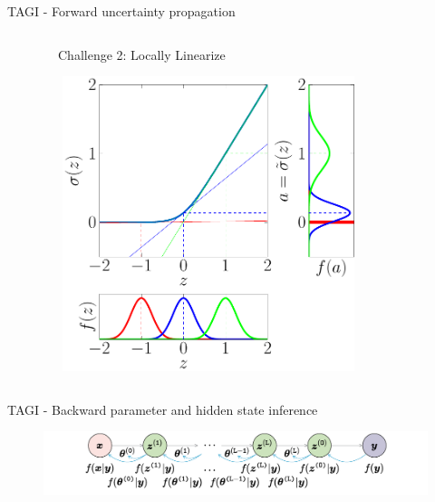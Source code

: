 \documentclass[final]{beamer}
\begin{document}
\begin{frame}[t]
\begin{columns}
\begin{column}[T]{.31\textwidth}
\begin{block}{TAGI - Forward uncertainty propagation}
\begin{columns}
\begin{column}{0.33\textwidth}
\end{column}
\begin{column}{0.33\textwidth}
\ \ \ \ \ {\color{cyan}Challenge 2:} Locally Linearize
 \begin{figure}[h!]
 \centering
  \includegraphics[width=0.8\textwidth]{Figures/Linearized_activation_fct.pdf}
 \end{figure}
\end{column}
\end{columns}
 \end{block}
 
\begin{block}{TAGI - Backward parameter and hidden state inference}
  \begin{figure}[h!]
 \centering
  \includegraphics[width=1\textwidth]{Figures/backward_pass.pdf}
 \end{figure}



\end{block}
\end{column}
\end{columns}
\end{frame}
\end{document}
